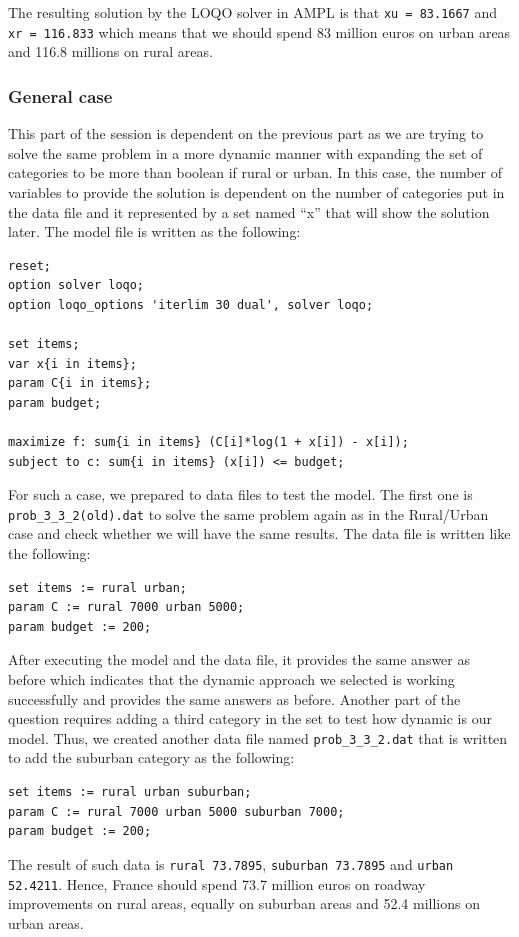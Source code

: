 The resulting solution by the LOQO solver in AMPL is that \texttt{xu = 83.1667} and \texttt{xr = 116.833} which means that we should spend 83 million euros on urban areas and 116.8 millions on rural areas.

\subsubsection{General case}
This part of the session is dependent on the previous part as we are trying to solve the same problem in a more dynamic manner with expanding the set of categories to be more than boolean if rural or urban. In this case, the number of variables to provide the solution is dependent on the number of categories put in the data file and it represented by a set named ``x'' that will show the solution later. The model file is written as the following:
\begin{verbatim}
reset;
option solver loqo;
option loqo_options 'iterlim 30 dual', solver loqo;

set items;
var x{i in items};
param C{i in items};
param budget;

maximize f: sum{i in items} (C[i]*log(1 + x[i]) - x[i]);
subject to c: sum{i in items} (x[i]) <= budget;
\end{verbatim}
For such a case, we prepared to data files to test the model. The first one is \texttt{prob\_3\_3\_2(old).dat} to solve the same problem again as in the Rural/Urban case and check whether we will have the same results. The data file is written like the following:

\begin{verbatim}
set items := rural urban;
param C := rural 7000 urban 5000;
param budget := 200;
\end{verbatim}

After executing the model and the data file, it provides the same answer as before which indicates that the dynamic approach we selected is working successfully and provides the same answers as before. Another part of the question requires adding a third category in the set to test how dynamic is our model. Thus, we created another data file named \texttt{prob\_3\_3\_2.dat} that is written to add the suburban category as the following:

\begin{verbatim}
set items := rural urban suburban;
param C := rural 7000 urban 5000 suburban 7000;
param budget := 200;
\end{verbatim}
The result of such data is \texttt{rural  73.7895}, \texttt{suburban  73.7895} and \texttt{urban  52.4211}. Hence, France should spend 73.7 million euros on roadway improvements on rural areas, equally on suburban areas and 52.4 millions on urban areas.


